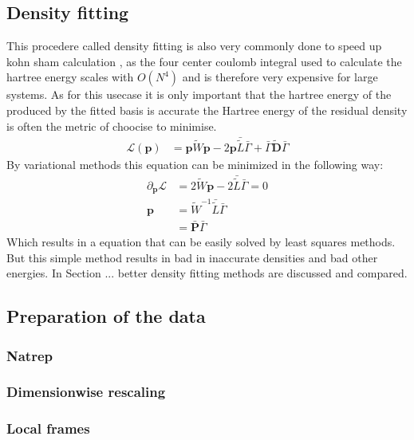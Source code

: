 \subsection{Density fitting}
This procedere called density fitting is also very commonly done to speed up kohn sham calculation , as the four center coulomb integral used to calculate the hartree energy scales with $O(N^4)$ and is therefore very expensive for large systems. As for this usecase it is only important that the hartree energy of the produced by the fitted basis is accurate the Hartree energy of the residual density is often the metric of choocise to minimise.
\begin{align}
        \mathcal{L}(\mathbf{p}) &= \mathbf{p} \tilde{W} \mathbf{p} - 2 \mathbf{p}\bar {\tilde L} \bar\Gamma + \bar\Gamma \tilde{\mathbf{D}}\bar\Gamma
\end{align}
By variational methods this equation can be minimized in the following way:
\begin{align}
\partial_{\mathbf p}\mathcal L&= 2\tilde{W} \mathbf{p}- 2 \bar {\tilde L} \bar\Gamma=0\\
\mathbf{p}&=\tilde{W}^{-1}\bar {\tilde L} \bar\Gamma\\
&=\bar{\mathbf{P}} \bar\Gamma
\end{align}
Which results in a equation that can be easily solved by least squares methods.
But this simple method results in bad in inaccurate densities and bad other energies.
In Section ... better density fitting methods are discussed and compared.
\subsection{Preparation of the data}
\subsubsection{Natrep}
\subsubsection{Dimensionwise rescaling}
\subsubsection{Local frames}
